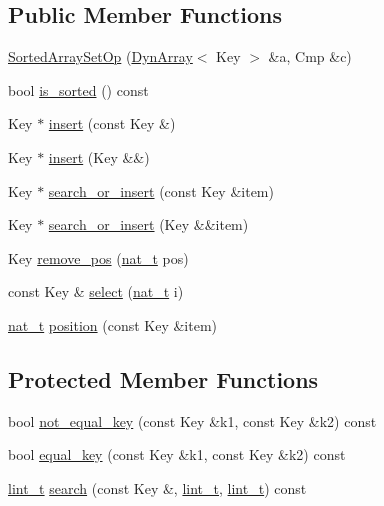 \subsection*{Public Member Functions}
\begin{DoxyCompactItemize}
\item 
\hyperlink{class_designar_1_1_sorted_array_set_op_a2d732318892f21ead8d988b5a76a016b}{Sorted\+Array\+Set\+Op} (\hyperlink{class_designar_1_1_dyn_array}{Dyn\+Array}$<$ Key $>$ \&a, Cmp \&c)
\item 
bool \hyperlink{class_designar_1_1_sorted_array_set_op_aa11c07509319e513a6f8dd0f3ab7663a}{is\+\_\+sorted} () const
\item 
Key $\ast$ \hyperlink{class_designar_1_1_sorted_array_set_op_aa23273a531de4a184c6a0bdf30816c79}{insert} (const Key \&)
\item 
Key $\ast$ \hyperlink{class_designar_1_1_sorted_array_set_op_a78058ddfd47003fc67d8a87068c5fc78}{insert} (Key \&\&)
\item 
Key $\ast$ \hyperlink{class_designar_1_1_sorted_array_set_op_a4daae3c1bd56ec08a02ce5a5f231aade}{search\+\_\+or\+\_\+insert} (const Key \&item)
\item 
Key $\ast$ \hyperlink{class_designar_1_1_sorted_array_set_op_ad0299c41514cf11f5a418b9e46994580}{search\+\_\+or\+\_\+insert} (Key \&\&item)
\item 
Key \hyperlink{class_designar_1_1_sorted_array_set_op_aa0ea019290a9b4a4777b5beb4c4d0c7d}{remove\+\_\+pos} (\hyperlink{namespace_designar_aa72662848b9f4815e7bf31a7cf3e33d1}{nat\+\_\+t} pos)
\item 
const Key \& \hyperlink{class_designar_1_1_sorted_array_set_op_ad08d29cf21ed0afa0e59ab86fb171108}{select} (\hyperlink{namespace_designar_aa72662848b9f4815e7bf31a7cf3e33d1}{nat\+\_\+t} i)
\item 
\hyperlink{namespace_designar_aa72662848b9f4815e7bf31a7cf3e33d1}{nat\+\_\+t} \hyperlink{class_designar_1_1_sorted_array_set_op_a138b326d0002cf3ddc19a980b1ca9542}{position} (const Key \&item)
\end{DoxyCompactItemize}
\subsection*{Protected Member Functions}
\begin{DoxyCompactItemize}
\item 
bool \hyperlink{class_designar_1_1_sorted_array_set_op_a27beb3e6b8f6b83c6efa46c38e8d22f9}{not\+\_\+equal\+\_\+key} (const Key \&k1, const Key \&k2) const
\item 
bool \hyperlink{class_designar_1_1_sorted_array_set_op_adef257a4a2debcef385f570b1cd72037}{equal\+\_\+key} (const Key \&k1, const Key \&k2) const
\item 
\hyperlink{namespace_designar_a9d113d66a39e82b73727c72cd3a52f73}{lint\+\_\+t} \hyperlink{class_designar_1_1_sorted_array_set_op_ab0dc92fe501e3349041aaafea39a6526}{search} (const Key \&, \hyperlink{namespace_designar_a9d113d66a39e82b73727c72cd3a52f73}{lint\+\_\+t}, \hyperlink{namespace_designar_a9d113d66a39e82b73727c72cd3a52f73}{lint\+\_\+t}) const
\end{DoxyCompactItemize}



